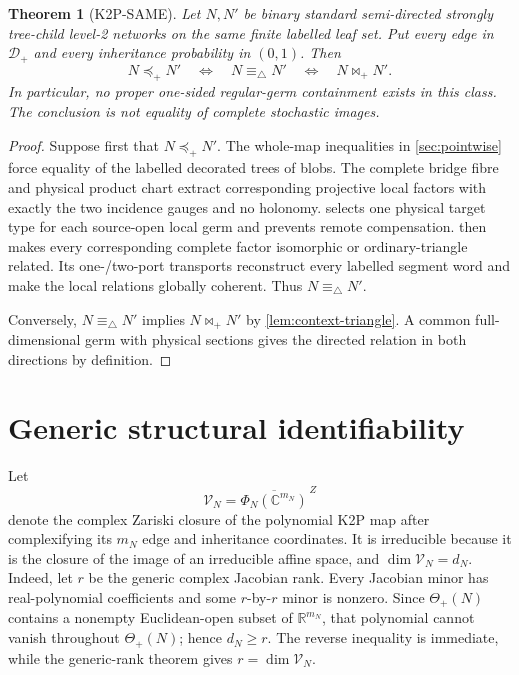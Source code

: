 \documentclass[11pt]{article}
\newtheorem{theorem}{Theorem}[section]
\theoremstyle{remark}
\newcommand{\R}{\mathbb R}
\newcommand{\C}{\mathbb C}
\newcommand{\V}{\mathcal V}
\newcommand{\Dplus}{\mathcal D_+}
\newcommand{\preceqplus}{\preceq_+}
\newcommand{\bowtieplus}{\mathbin{\bowtie}_+}
\newcommand{\trianglerel}{\equiv_\triangle}
\newcommand{\1}{\mathbf 1}
\begin{document}
\begin{theorem}[K2P-SAME]\label{thm:main}
Let \(N,N'\) be binary standard semi-directed strongly tree-child level-2
networks on the same finite labelled leaf set.  Put every edge in \(\Dplus\)
and every inheritance probability in \((0,1)\).  Then
\begin{equation}\label{eq:main}
 \boxed{
 N\preceqplus N'
 \quad\Longleftrightarrow\quad
 N\trianglerel N'
 \quad\Longleftrightarrow\quad
 N\bowtieplus N'.}
\end{equation}
In particular, no proper one-sided regular-germ containment exists in this
class.  The conclusion is not equality of complete stochastic images.
\end{theorem}

\begin{proof}
Suppose first that \(N\preceqplus N'\).  The whole-map inequalities in
\cref{sec:pointwise} force equality of the labelled decorated trees of blobs.
The complete bridge fibre and physical product chart extract corresponding
projective local factors with exactly the two incidence gauges and no
holonomy.   selects one physical target type for each
source-open local germ and prevents remote compensation.
 then makes every corresponding complete factor isomorphic
or ordinary-triangle related.  Its one-/two-port transports reconstruct every
labelled segment word and make the local relations globally coherent.  Thus
\(N\trianglerel N'\).

Conversely, \(N\trianglerel N'\) implies \(N\bowtieplus N'\) by
\cref{lem:context-triangle}.  A common full-dimensional germ with physical
sections gives the directed relation in both directions by definition.
\end{proof}

\section{Generic structural identifiability}\label{sec:genericity}

Let
\[
 \V_N=\overline{\Phi_N(\C^{m_N})}^{\,Z}
\]
denote the complex Zariski closure of the polynomial K2P map after complexifying
its \(m_N\) edge and inheritance coordinates.  It is irreducible because it is
the closure of the image of an irreducible affine space, and
\(\dim\V_N=d_N\).  Indeed, let \(r\) be the generic complex Jacobian rank.
Every Jacobian minor has real-polynomial coefficients and some
\(r\)-by-\(r\) minor is nonzero.  Since \(\Theta_+(N)\) contains a nonempty
Euclidean-open subset of \(\R^{m_N}\), that polynomial cannot vanish
throughout \(\Theta_+(N)\); hence \(d_N\ge r\).  The reverse inequality is
immediate, while the generic-rank theorem gives \(r=\dim\V_N\).
\end{document}
